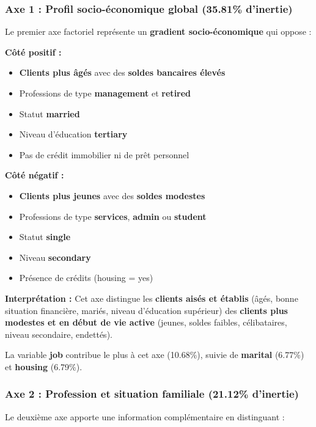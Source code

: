\documentclass[12pt,a4paper]{article}
\begin{document}
\subsubsection{Axe 1 : Profil socio-économique global (35.81\% d'inertie)}

Le premier axe factoriel représente un \textbf{gradient socio-économique} qui oppose :

\textbf{Côté positif :}
\begin{itemize}
    \item \textbf{Clients plus âgés} avec des \textbf{soldes bancaires élevés}
    \item Professions de type \textbf{management} et \textbf{retired}
    \item Statut \textbf{married}
    \item Niveau d'éducation \textbf{tertiary}
    \item Pas de crédit immobilier ni de prêt personnel
\end{itemize}

\textbf{Côté négatif :}
\begin{itemize}
    \item \textbf{Clients plus jeunes} avec des \textbf{soldes modestes}
    \item Professions de type \textbf{services}, \textbf{admin} ou \textbf{student}
    \item Statut \textbf{single}
    \item Niveau \textbf{secondary}
    \item Présence de crédits (housing = yes)
\end{itemize}

\textbf{Interprétation :} Cet axe distingue les \textbf{clients aisés et établis} (âgés, bonne situation financière, mariés, niveau d'éducation supérieur) des \textbf{clients plus modestes et en début de vie active} (jeunes, soldes faibles, célibataires, niveau secondaire, endettés).

La variable \textbf{job} contribue le plus à cet axe (10.68\%), suivie de \textbf{marital} (6.77\%) et \textbf{housing} (6.79\%).

\subsubsection{Axe 2 : Profession et situation familiale (21.12\% d'inertie)}

Le deuxième axe apporte une information complémentaire en distinguant :
\end{document}

